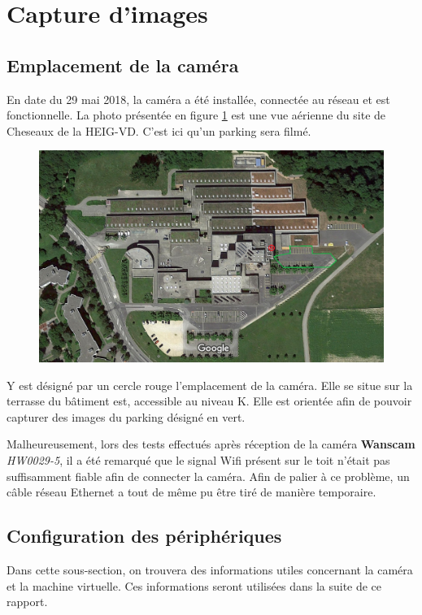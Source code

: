 \section{Capture d'images}\label{realisation.capture}
\subsection{Emplacement de la caméra}
En date du 29 mai 2018, la caméra a été installée, connectée au réseau et est fonctionnelle. La photo présentée en figure \ref{fig:cam_parking_annotation} est une vue aérienne du site de Cheseaux de la HEIG-VD. C'est ici qu'un parking sera filmé.

\begin{figure}[H]
    \includegraphics[width=14cm]{img/conception/cam_parking_location.png}
    \centering
    \label{fig:cam_parking_annotation}
\end{figure} 

Y est désigné par un cercle rouge l'emplacement de la caméra. Elle se situe sur la terrasse du bâtiment est, accessible au niveau K. Elle est orientée afin de pouvoir capturer des images du parking désigné en vert. 

Malheureusement, lors des tests effectués après réception de la caméra \textbf{Wanscam} \textit{HW0029-5}, il a été remarqué que le signal Wifi présent sur le toit n'était pas suffisamment fiable afin de connecter la caméra. Afin de palier à ce problème, un câble réseau Ethernet a tout de même pu être tiré de manière temporaire.

\subsection{Configuration des périphériques}
Dans cette sous-section, on trouvera des informations utiles concernant la caméra et la machine virtuelle. Ces informations seront utilisées dans la suite de ce rapport. 

